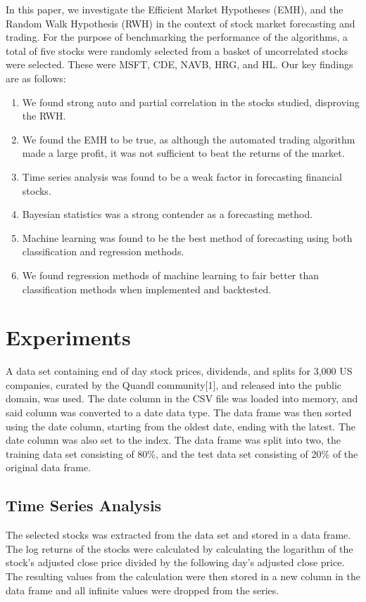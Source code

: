 \documentclass[times]{jtitauth}
\begin{document}
In this paper, we investigate the Efficient Market Hypotheses (EMH), and the Random Walk Hypothesis (RWH) in the context of stock market forecasting and trading. For the purpose of benchmarking the performance of the algorithms, a total of five stocks were randomly selected from a basket of uncorrelated stocks were selected. These were MSFT, CDE, NAVB, HRG, and HL. Our key findings are as follows:

\begin{enumerate}
  \item We found strong auto and partial correlation in the stocks studied, disproving the RWH.
  \item We found the EMH to be true, as although the automated trading algorithm made a large profit, it was not sufficient to beat the returns of the market.
  \item Time series analysis was found to be a weak factor in forecasting financial stocks.
  \item Bayesian statistics was a strong contender as a forecasting method.
  \item Machine learning was found to be the best method of forecasting using both classification and regression methods. 
  \item We found regression methods of machine learning to fair better than classification methods when implemented and backtested.
\end{enumerate}

\section{Experiments}
A data set containing end of day stock prices, dividends, and splits for 3,000 US companies, curated by the Quandl community[1], and released into the public domain, was used. The date column in the CSV file was loaded into memory, and said column was converted to a date data type. The data frame was then sorted using the date column, starting from the oldest date, ending with the latest. The date column was also set to the index. The data frame was split into two, the training data set consisting of 80\%, and the test data set consisting of 20\% of the original data frame.

\subsection{Time Series Analysis}
The selected stocks was extracted from the data set and stored in a data frame. The log returns of the stocks were calculated by calculating the logarithm of the stock's adjusted close price divided by the following day's adjusted close price. The resulting values from the calculation were then stored in a new column in the data frame and all infinite values were dropped from the series.
\end{document}
